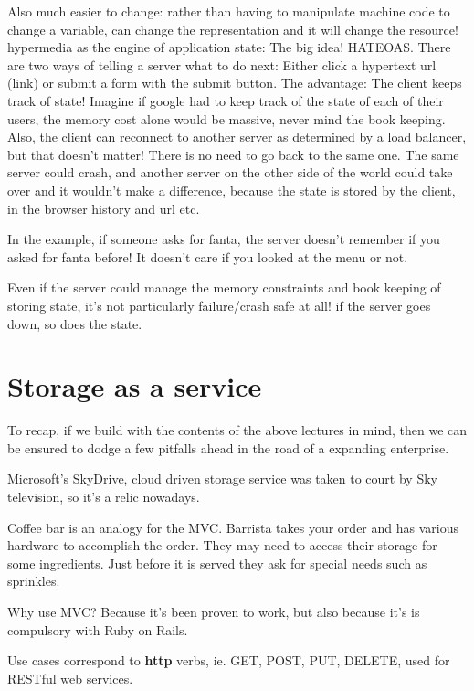 \documentclass[11pt]{article}
\begin{document}
Also much easier to change: rather than having to manipulate machine code to change a variable, can change the representation and it will change the resource!
hypermedia as the engine of application state: The big idea! HATEOAS. There are two ways of telling a server what to do next: Either click a hypertext url (link) or submit a form with the submit button. The advantage: The client keeps track of state! Imagine if google had to keep track of the state of each of their users, the memory cost alone would be massive, never mind the book keeping. Also, the client can reconnect to another server as determined by a load balancer, but that doesn’t matter! There is no need to go back to the same one. The same server could crash, and another server on the other side of the world could take over and it wouldn’t make a difference, because the state is stored by the client, in the browser history and url etc.

In the example, if someone asks for fanta, the server doesn’t remember if you asked for fanta before! It doesn’t care if you looked at the menu or not.

Even if the server could manage the memory constraints and book keeping of storing state, it’s not particularly failure/crash safe at all! if the server goes down, so does the state.


\section{Storage as a service}

To recap, if we build with the contents of the above lectures in mind, then we can be ensured to dodge a few pitfalls ahead in the road of a expanding enterprise.

Microsoft’s SkyDrive, cloud driven storage service was taken to court by Sky television, so it’s a relic nowadays.

Coffee bar is an analogy for the MVC. Barrista takes your order and has various hardware to accomplish the order. They may need to access their storage for some ingredients. Just before it is served they ask for special needs such as sprinkles.

Why use MVC? Because it’s been proven to work, but also because it’s is compulsory with Ruby on Rails.

Use cases correspond to \textbf{http} verbs, ie. GET, POST, PUT, DELETE, used for RESTful web services.
\end{document}
